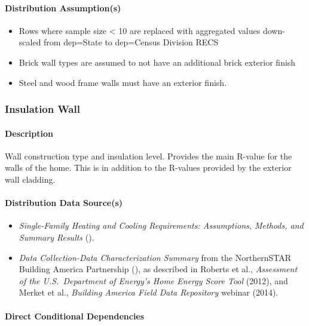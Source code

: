 \paragraph{Distribution Assumption(s)}
\begin{itemize}
\item
  Rows where sample size \textless{} 10 are replaced with aggregated
  values down-scaled from dep=\textquotesingle State\textquotesingle{}
  to dep=\textquotesingle Census Division RECS\textquotesingle{}
\item
  Brick wall types are assumed to not have an additional brick exterior
  finish
\item
  Steel and wood frame walls must have an exterior finish.
\end{itemize}

\subsubsection{Insulation Wall}\label{insulation_wall}
\paragraph{Description}
Wall construction type and insulation level. Provides the main R-value for the walls of the home. This is in addition to the R-values provided by the exterior wall cladding. 

\paragraph{Distribution Data Source(s)}
\begin{itemize}
 
\item
  \textit{Single-Family Heating and Cooling Requirements: Assumptions, Methods, and Summary Results} (\cite{Ritschard1992}).
\item
  
  \textit{Data Collection-Data Characterization Summary} from the NorthernSTAR Building America Partnership (\cite{Nettleton2012}), as described in 
  Roberts et al., \textit{Assessment of the U.S.~Department of
  Energy's Home Energy Score Tool} (2012),
  and Merket et al., \textit{Building America Field Data Repository} webinar (2014).
\end{itemize}
\paragraph{Direct Conditional Dependencies}
 
